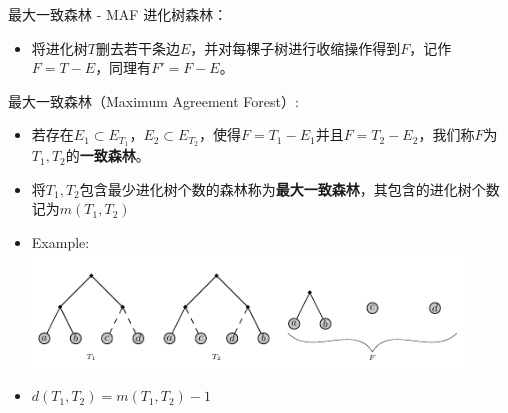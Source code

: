 \documentclass[slidestop,compress,mathserif,red]{beamer}
\begin{document}
\begin{frame}{最大一致森林 - MAF}
    进化树森林：
    \begin{itemize}
      \item 将进化树$T$删去若干条边$E$，并对每棵子树进行收缩操作得到$F$，记作\textbf{$F=T-E$}，同理有$F'=F-E$。
    \end{itemize}
    \pause
    最大一致森林（Maximum Agreement Forest）:
    \begin{itemize}
      \item 若存在$E_1 \subset E_{T_1}$，$E_2 \subset E_{T_2}$，使得$F=T_1 - E_1$并且$F=T_2 - E_2$，我们称$F$为$T_1,T_2$的\textbf{一致森林}。
      \pause
      \item 将$T_1,T_2$包含最少进化树个数的森林称为\textbf{最大一致森林}，其包含的进化树个数记为\textbf{$m(T_1,T_2)$}
      \pause
      \item Example: \\
      \includegraphics[width=0.9\textwidth, height=0.5\textheight, keepaspectratio]{./pic/maf.pdf}
      \pause
      \item $d(T_1,T_2) = m(T_1,T_2) - 1 $
    \end{itemize}
\end{frame}
\end{document}
